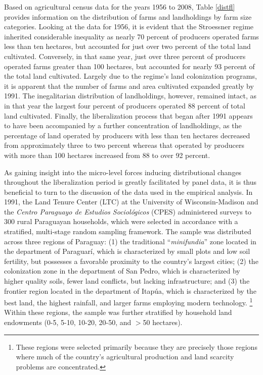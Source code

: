 \documentclass[english]{article}
\begin{document}
Based on agricultural census data for the years 1956 to 2008, Table \ref{distfl} 
provides information on the distribution of farms and landholdings by farm 
size categories. 
Looking at the data for 1956, it is evident that the Stroessner regime 
inherited considerable inequality as nearly 70 percent of producers 
operated farms less than ten hectares, but accounted for just over two 
percent of the total land cultivated.
Conversely, in that same year, just over three percent of producers operated
farms greater than 100 hectares, but accounted for nearly 93 percent
of the total land cultivated.
Largely due to the regime's land colonization programs, it is apparent that 
the number of farms and area cultivated expanded greatly by 1991. 
The inegalitarian distribution of landholdings, however, remained intact, as in 
that year the largest four percent of producers operated 88 percent of total 
land cultivated.
Finally, the liberalization process that began after 1991 appears to have been
accompanied by a further concentration of landholdings, as the percentage of 
land operated by producers with less than ten hectares decreased from 
approximately three to two percent whereas that operated by producers with 
more than 100 hectares increased from 88 to over 92 percent.

As gaining insight into the micro-level forces inducing distributional changes 
throughout the liberalization period is greatly facilitated by panel data, it is thus 
beneficial to turn to the discussion of the data used in the empirical analysis.
In 1991, the Land Tenure Center (LTC) at the University of 
Wisconsin-Madison and the \emph{Centro Paraguayo de Estudios 
Sociol\'{o}gicos} (CPES) administered surveys to 300 rural Paraguayan 
households, which were selected in accordance with a stratified, multi-stage 
random sampling framework. 
The sample was distributed across three regions of Paraguay: (1) the traditional 
``\emph{minifundia}'' zone located in the department of Paraguar\'{i}, 
which is characterized by small plots and low soil fertility, but possesses a 
favorable proximity to the country's largest cities; (2) the colonization zone in 
the department of San Pedro, which is characterized by higher quality soils, 
fewer land conflicts, but lacking infrastructure; and (3) the frontier region 
located in the department of Itap\'{u}a, which is characterized by the best 
land, the highest rainfall, and larger farms employing modern technology.%
\footnote{These regions were selected primarily because they are precisely 
those regions where much of the country's agricultural production and 
land scarcity problems are concentrated.}
Within these regions, the sample was further stratified by household land 
endowments (0-5, 5-10, 10-20, 20-50, and $>$50 hectares).
\end{document}

